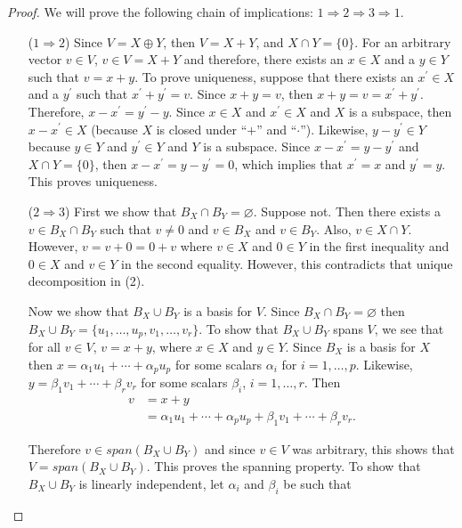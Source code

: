 \documentclass[12pt]{article}
\theoremstyle{definition}
\begin{document}
\begin{proof}
We will prove the following chain of implications: $1 \Rightarrow 2 \Rightarrow 3 \Rightarrow 1$.

\begin{itemize}
\item[($1 \Rightarrow 2$)] Since $V = X \oplus Y$, then $V = X + Y$, and $X \cap Y = \{0\}$.
For an arbitrary vector $v \in V$, $v \in V = X + Y$ and therefore, there exists an $x \in X$ and
a $y \in Y$ such that $v = x + y$. To prove uniqueness, suppose that there exists an $x^{\prime} \in X$
and a $y^{\prime}$ such that $x^{\prime} + y^{\prime} = v$. Since $x + y = v$, then 
$x + y = v = x^{\prime} + y^{\prime}$. Therefore, $x - x^{\prime} = y^{\prime} - y$. Since $x \in X$
and $x^{\prime} \in X$ and $X$ is a subspace, then $x - x^{\prime} \in X$ (because $X$ is
closed under ``$+$'' and ``$\cdot$''). Likewise, $y - y^{\prime} \in Y$ because $y \in Y$
and $y^{\prime} \in Y$ and $Y$ is a subspace. Since $x - x^{\prime} = y - y^{\prime}$ and
$X \cap Y = \{0\}$, then $x - x^{\prime} = y - y^{\prime} = 0$, which implies that
$x^{\prime} = x$ and $y^{\prime} = y$. This proves uniqueness.

\item[($2 \Rightarrow 3$)] First we show that $B_X \cap B_Y = \varnothing$. Suppose not. Then
there exists a $v \in B_X \cap B_Y$ such that $v \neq 0$ and $v \in B_X$ and $v \in B_Y$.
Also, $v \in X \cap Y$. However, $v = v + 0 = 0 + v$ where $v \in X$ and $0 \in Y$ in the
first inequality and $0 \in X$ and $v \in Y$ in the second equality. However, this contradicts
that unique decomposition in (2).


Now we show that $B_X \cup B_Y$ is a basis for $V$. Since $B_X \cap B_Y = \varnothing$ then
$B_X \cup B_Y = \{u_1, \ldots, u_p, v_1, \ldots, v_r \}$. To show that $B_X \cup B_Y$ spans
$V$, we see that for all $v \in V$, $v = x + y$, where $x \in X$ and $y \in Y$. Since
$B_X$ is a basis for $X$ then $x = \alpha_1 u_1 + \cdots + \alpha_p u_p$ for some
scalars $\alpha_i$ for $i = 1, \ldots, p$. Likewise, 
$y = \beta_1 v_1 + \cdots + \beta_r v_r$ for some scalars $\beta_i$, $i = 1, \ldots, r$.
Then
\begin{align*}
v &= x + y \\
&= \alpha_1 u_1 + \cdots + \alpha_p u_p + \beta_1 v_1 + \cdots + \beta_r v_r.
\end{align*}

Therefore $v \in span(B_X \cup B_Y)$ and since $v \in V$ was arbitrary, this shows
that $V = span(B_X \cup B_Y)$. This proves the spanning property. To show that $B_X \cup B_Y$
is linearly independent, let $\alpha_i$ and $\beta_i$ be such that



\end{itemize}
\end{proof}
\end{document}
